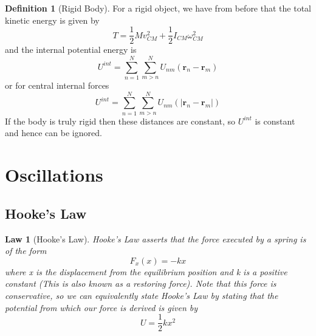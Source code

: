 \documentclass[12pt]{article}
\newtheorem{law}[thm]{Law}
\theoremstyle{definition}
\newtheorem{defn}[thm]{Definition}
\theoremstyle{remark}
\numberwithin{equation}{section}
\newcommand\B[1]{\textbf{#1}}
\begin{document}
\begin{defn}[Rigid Body]
        For a rigid object, we have from before that the total kinetic energy is given by \begin{equation}
                T = \frac{1}{2}Mv_{CM}^2 + \frac{1}{2}I_{CM}\omega_{CM}^2
        \end{equation}
        and the internal potential energy is \begin{equation}
                U^{int} = \sum\limits_{n=1}^N\sum\limits_{m>n}^NU_{nm}(\B{r}_n - \B{r}_m) 
        \end{equation}
        or for central internal forces \begin{equation}
                U^{int} = \sum\limits_{n=1}^N\sum\limits_{m>n}^NU_{nm}(|\B{r}_n - \B{r}_m|) 
        \end{equation}
        If the body is truly rigid then these distances are constant, so $U^{int}$ is constant and hence can be ignored.
\end{defn}










\clearpage
\section{Oscillations}


\subsection{Hooke's Law}

\begin{law}[Hooke's Law]
        Hooke's Law asserts that the force executed by a spring is of the form \begin{equation}
                F_x(x) = -kx
        \end{equation}
        where x is the displacement from the equilibrium position and k is a positive constant (This is also known as a restoring force). Note that this force is conservative, so we can equivalently state Hooke's Law by stating that the potential from which our force is derived is given by \begin{equation}
                U = \frac{1}{2}kx^2
        \end{equation}
\end{law}

\vspace{15pt}
\end{document}
